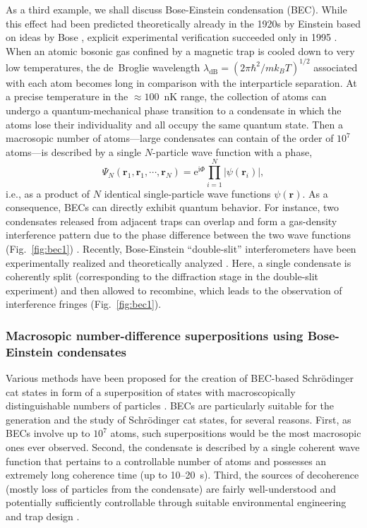 \documentclass[twocolumn,aps,floatfix,amsmath,amssymb,showpacs,nofootinbib]{revtex4}
\newcommand{\be}{\begin{equation}} \newcommand{\ee}{\end{equation}}
\newcommand{\e}{\ensuremath{\mathrm{e}}}
\begin{document}
As a third example, we shall discuss Bose-Einstein condensation (BEC).
While this effect had been predicted theoretically already in the
1920s by Einstein
\cite{Einstein:1924:om,Einstein:1925:om,Einstein:1925:oy} based on
ideas by Bose \cite{Bose:1924:om}, explicit experimental verification
succeeded only in 1995
\cite{Bradley:1995:om,Davis:1995:mm,Anderson:1995:mx,Bradley:1997:nu}.
When an atomic bosonic gas confined by a magnetic trap is cooled down
to very low temperatures, the de~Broglie wavelength $\lambda_\text{dB}
= (2\pi\hbar^2/mk_BT)^{1/2}$ associated with each atom becomes long in
comparison with the interparticle separation. At a precise temperature
in the $\approx 100$~nK range, the collection of atoms can undergo a
quantum-mechanical phase transition to a condensate in which the atoms
lose their individuality and all occupy the same quantum state. Then a
macrosopic number of atoms---large condensates can contain of the
order of $10^7$ atoms---is described by a single $N$-particle wave
function with a phase,
%
\be
\Psi_N(\mathbf{r}_1, \mathbf{r}_1, \cdots
,\mathbf{r}_N) = \e^{\mathrm{i}\Phi} \prod_{i=1}^N |\psi(\mathbf{r}_i)|, 
\ee
%
i.e., as a product of $N$ identical single-particle wave functions
$\psi(\mathbf{r})$. As a consequence, BECs can directly exhibit
quantum behavior. For instance, two condensates released from adjacent
traps can overlap and form a gas-density interference pattern due to
the phase difference between the two wave functions
(Fig.~\ref{fig:bec1})
\cite{Javanainen:1996:mm,Andrews:1997:um,Rohrl:1997:pp,Javanainen:2005:mo,Saba:2005:lm}.
Recently, Bose-Einstein ``double-slit'' interferometers have been
experimentally realized \cite{Shin:2004:lo} and theoretically analyzed
\cite{Collins:2005:uu}. Here, a single condensate is coherently split
(corresponding to the diffraction stage in the double-slit experiment)
and then allowed to recombine, which leads to the observation of
interference fringes (Fig.~\ref{fig:bec1}).


\subsubsection{Macrosopic number-difference superpositions using Bose-Einstein condensates}

Various methods have been proposed for the creation of BEC-based
Schr\"odinger cat states in form of a superposition of states with
macroscopically distinguishable numbers of particles
\cite{Cirac:1998:mm,Ruostekoski:1998:mm,Gordon:1999:mh,Dunningham:2001:da,%
Calsamiglia:2001:tt,Louis:2001:mu,Micheli:2003:jn}.  BECs are
particularly suitable for the generation and the study of
Schr\"odinger cat states, for several reasons. First, as BECs involve
up to $10^7$ atoms, such superpositions would be the most macrosopic
ones ever observed.  Second, the condensate is described by a single
coherent wave function that pertains to a controllable number of atoms
and possesses an extremely long coherence time (up to 10--20~s).
Third, the sources of decoherence (mostly loss of particles from the
condensate) are fairly well-understood and potentially sufficiently
controllable through suitable environmental engineering and trap
design \cite{Ruostekoski:1998:tt,Kuang:1999:tb,Dalvit:2000:bb}.
\end{document}

